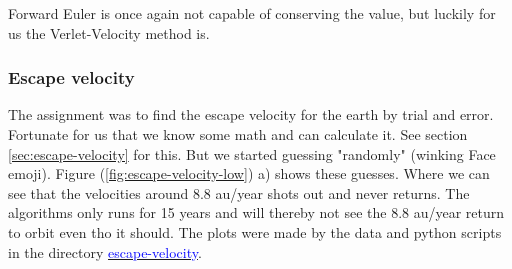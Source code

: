 Forward Euler is once again not capable of conserving the value, but luckily for us the Verlet-Velocity method is. 













\subsubsection{Escape velocity}

The assignment was to find the escape velocity for the earth by trial and error. Fortunate for us that we know some math and can calculate it. See section \ref{sec:escape-velocity} for this. But we started guessing "randomly" (winking Face emoji). Figure (\ref{fig:escape-velocity-low}) a) shows these guesses. Where we can see that the velocities around 8.8 au/year shots out and never returns. 
The algorithms only runs for 15 years and will thereby not see the 8.8 au/year return to orbit even tho it should. The plots were made by the data and python scripts in the directory \href{https://github.com/erikfsk/Project-3/tree/master/Project3/escape-velocity}{\textcolor{blue}{escape-velocity}}.

